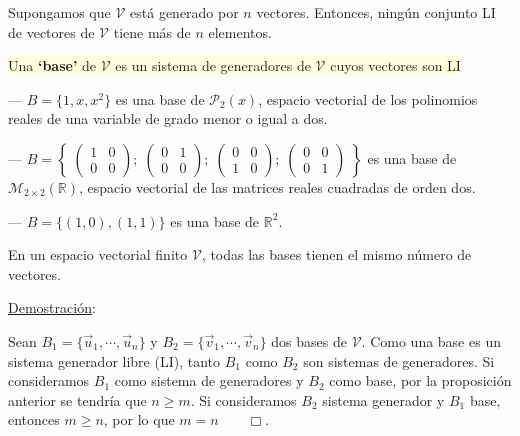 \begin{theorem}

Supongamos que $\mathcal V$ está generado por $n$ vectores. Entonces, ningún conjunto LI de vectores de $\mathcal V$ tiene más de $n$ elementos.	
\end{theorem}

\begin{definition} 

\colorbox{LightYellow}{ Una \textbf{`base'} de $\mathcal V$ es un sistema de generadores de $\mathcal V$ cuyos vectores son LI   }	
\end{definition}
 
\begin{cuadro-gris}

--- $B=\{1,x,x^2\}$ es una base de $\mathcal P_2(x)$, espacio vectorial de los polinomios reales de una variable de grado menor o igual a dos.	

--- $B= \left\{\; 
\left(\begin{matrix} 1&0\\0&0\end{matrix} \right);\;
\left(\begin{matrix} 0&1\\0&0 \end{matrix} \right);\;
\left(\begin{matrix} 0&0\\1&0\end{matrix} \right); \; 
\left(\begin{matrix} 0&0\\0&1 \end{matrix} \right) \;\right\}$ es una base de $\mathcal M_{2 \times 2}(\mathbb R)$, espacio vectorial de las matrices reales cuadradas de orden dos.

--- $B=\{(1,0), (1,1)\}$ es una base de $\mathbb R^2$.
\end{cuadro-gris}

\begin{theorem} 

En un espacio vectorial finito $\mathcal V$, todas las bases tienen el mismo número de vectores.	
\end{theorem}

\underline{Demostración}:

\noindent \textcolor{gris}{ Sean $B_1=\{ \vec u_1, \cdots , \vec u_n\}$ y  $B_2=\{ \vec v_1, \cdots , \vec v_n\}$   dos bases de $\mathcal V$. Como una base es un sistema generador libre (LI), tanto $B_1$ como $B_2$ son sistemas de generadores. Si consideramos $B_1$ como sistema de generadores y $B_2$ como base, por la proposición anterior se tendría que $n\ge m$. Si consideramos $B_2$ sistema generador y $B_1$ base, entonces $m\ge n$, por lo que $m=n \qquad \Box$. }
	


